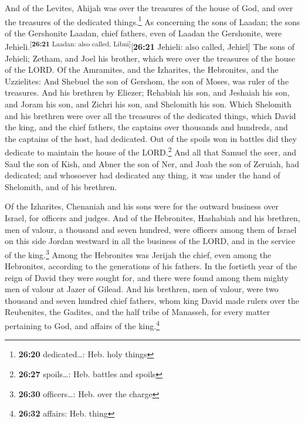  And of the Levites, Ahijah was over the treasures of the
house of God, and over the treasures of the dedicated things.\footnote{\textbf{26:20}
  dedicated\ldots: Heb. holy things}  As concerning the
sons of Laadan; the sons of the Gershonite Laadan, chief fathers, even
of Laadan the Gershonite, were
Jehieli.\textsuperscript{{[}\textbf{26:21} Laadan: also called,
Libni{]}}{[}\textbf{26:21} Jehieli: also called, Jehiel{]}
 The sons of Jehieli; Zetham, and Joel his brother, which
were over the treasures of the house of the LORD.  Of the
Amramites, and the Izharites, the Hebronites, and the Uzzielites:
 And Shebuel the son of Gershom, the son of Moses, was
ruler of the treasures.  And his brethren by Eliezer;
Rehabiah his son, and Jeshaiah his son, and Joram his son, and Zichri
his son, and Shelomith his son.  Which Shelomith and his
brethren were over all the treasures of the dedicated things, which
David the king, and the chief fathers, the captains over thousands and
hundreds, and the captains of the host, had dedicated. 
Out of the spoils won in battles did they dedicate to maintain the house
of the LORD.\footnote{\textbf{26:27} spoils\ldots: Heb. battles and
  spoils}  And all that Samuel the seer, and Saul the son
of Kish, and Abner the son of Ner, and Joab the son of Zeruiah, had
dedicated; and whosoever had dedicated any thing, it was under the hand
of Shelomith, and of his brethren.

 Of the Izharites, Chenaniah and his sons were for the
outward business over Israel, for officers and judges. 
And of the Hebronites, Hashabiah and his brethren, men of valour, a
thousand and seven hundred, were officers among them of Israel on this
side Jordan westward in all the business of the LORD, and in the service
of the king.\footnote{\textbf{26:30} officers\ldots: Heb. over the
  charge}  Among the Hebronites was Jerijah the chief,
even among the Hebronites, according to the generations of his fathers.
In the fortieth year of the reign of David they were sought for, and
there were found among them mighty men of valour at Jazer of Gilead.
 And his brethren, men of valour, were two thousand and
seven hundred chief fathers, whom king David made rulers over the
Reubenites, the Gadites, and the half tribe of Manasseh, for every
matter pertaining to God, and affairs of the king.\footnote{\textbf{26:32}
  affairs: Heb. thing}

